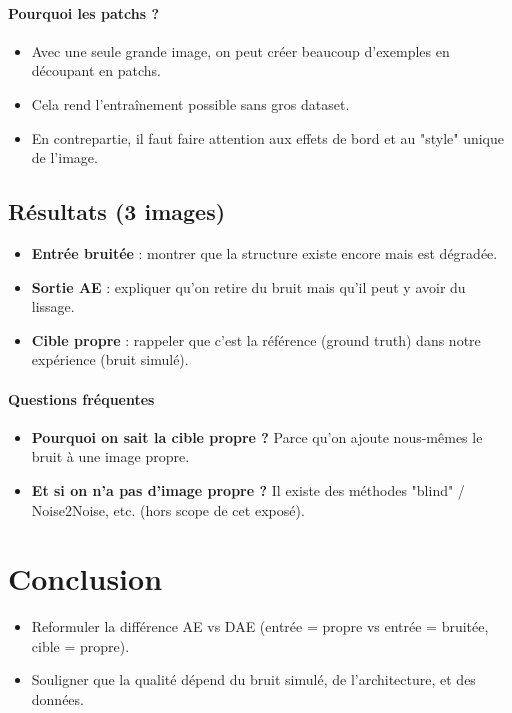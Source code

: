 \documentclass[11pt,a4paper]{article}
\begin{document}
\paragraph{Pourquoi les patchs ?}
\begin{itemize}
  \item Avec une seule grande image, on peut créer beaucoup d'exemples en découpant en patchs.
  \item Cela rend l'entraînement possible sans gros dataset.
  \item En contrepartie, il faut faire attention aux effets de bord et au "style" unique de l'image.
\end{itemize}

\subsection{Résultats (3 images)}
\begin{itemize}
  \item \textbf{Entrée bruitée} : montrer que la structure existe encore mais est dégradée.
  \item \textbf{Sortie AE} : expliquer qu'on retire du bruit mais qu'il peut y avoir du lissage.
  \item \textbf{Cible propre} : rappeler que c'est la référence (ground truth) dans notre expérience (bruit simulé).
\end{itemize}

\paragraph{Questions fréquentes}
\begin{itemize}
  \item \textbf{Pourquoi on sait la cible propre ?} Parce qu'on ajoute nous-mêmes le bruit à une image propre.
  \item \textbf{Et si on n'a pas d'image propre ?} Il existe des méthodes "blind" / Noise2Noise, etc. (hors scope de cet exposé).
\end{itemize}

\section{Conclusion}
\begin{itemize}
  \item Reformuler la différence AE vs DAE (entrée = propre vs entrée = bruitée, cible = propre).
  \item Souligner que la qualité dépend du bruit simulé, de l'architecture, et des données.
\end{itemize}
\end{document}
